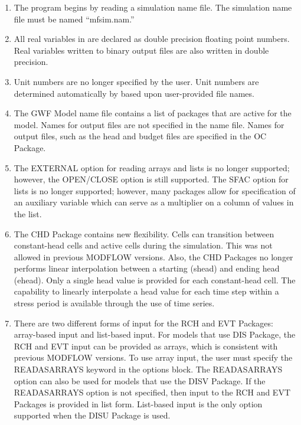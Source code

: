 \begin{enumerate}

\item The \mf program begins by reading a simulation name file.  The simulation name file must be named ``mfsim.nam.''

\item All real variables in \mf are declared as double precision floating point numbers.  Real variables written to binary output files are also written in double precision.

\item Unit numbers are no longer specified by the user.  Unit numbers are determined automatically by \mf based upon user-provided file names.

\item The GWF Model name file contains a list of packages that are active for the model.  Names for output files are not specified in the name file.  Names for output files, such as the head and budget files are specified in the OC Package.

\item The EXTERNAL option for reading arrays and lists is no longer supported; however, the OPEN/CLOSE option is still supported.  The SFAC option for lists is no longer supported; however, many packages allow for specification of an auxiliary variable which can serve as a multiplier on a column of values in the list.

\item The CHD Package contains new flexibility.  Cells can transition between constant-head cells and active cells during the simulation.  This was not allowed in previous MODFLOW versions.  Also, the CHD Packages no longer performs linear interpolation between a starting (shead) and ending head (ehead).  Only a single head value is provided for each constant-head cell.  The capability to linearly interpolate a head value for each time step within a stress period is available through the use of time series.

\item There are two different forms of input for the RCH and EVT Packages: array-based input and list-based input.  For models that use DIS Package, the RCH and EVT input can be provided as arrays, which is consistent with previous MODFLOW versions.  To use array input, the user must specify the READASARRAYS keyword in the options block.  The READASARRAYS option can also be used for models that use the DISV Package.  If the READASARRAYS option is not specified, then input to the RCH and EVT Packages is provided in list form.  List-based input is the only option supported when the DISU Package is used.


\end{enumerate}
